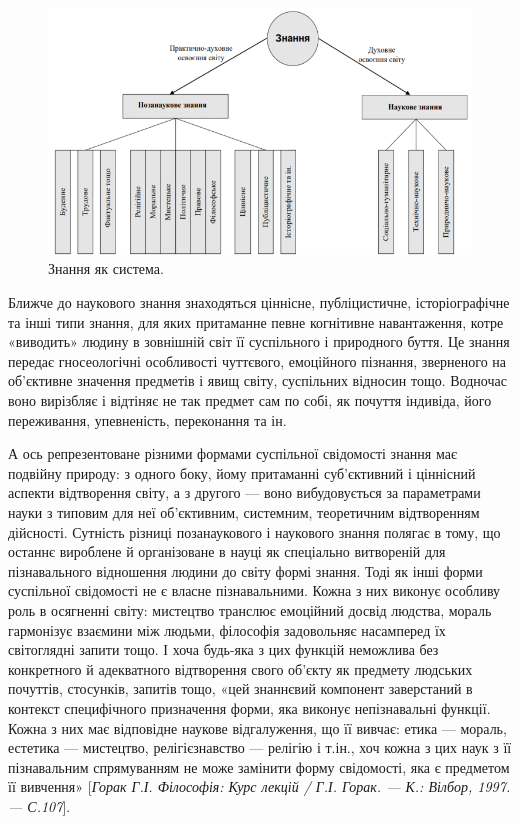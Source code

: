 \begin{figure}[ht]
	\centering
	\includegraphics[scale=.5]{images/filosophy_diagram_1.png}
	\caption{Знання як система.}\label{fig:philosophy:knolage_as_a_system}
\end{figure}

Ближче до наукового знання знаходяться ціннісне, публіцистичне,
історіографічне та інші типи знання, для яких притаманне певне когнітивне
навантаження, котре «виводить» людину в зовнішній світ її суспільного і
природного буття. Це знання передає гносеологічні особливості чуттєвого,
емоційного пізнання, зверненого на об’єктивне значення предметів і явищ
світу, суспільних відносин тощо. Водночас воно вирізбляє і відтіняє не так
предмет сам по собі, як почуття індивіда, його переживання, упевненість,
переконання та ін.

А ось репрезентоване різними формами суспільної свідомості знання має
подвійну природу: з одного боку, йому притаманні суб’єктивний і ціннісний
аспекти відтворення світу, а з другого --- воно вибудовується за параметрами
науки з типовим для неї об’єктивним, системним, теоретичним відтворенням
дійсності. Сутність різниці позанаукового і наукового знання полягає в тому,
що останнє вироблене й організоване в науці як спеціально витвореній для
пізнавального відношення людини до світу формі знання. Тоді як інші форми
суспільної свідомості не є власне пізнавальними. Кожна з них виконує
особливу роль в осягненні світу: мистецтво транслює емоційний досвід
людства, мораль гармонізує взаємини між людьми, філософія задовольняє
насамперед їх світоглядні запити тощо. І хоча будь-яка з цих функцій
неможлива без конкретного й адекватного відтворення свого об’єкту як
предмету людських почуттів, стосунків, запитів тощо, «цей знаннєвий
компонент заверстаний в контекст специфічного призначення форми, яка
виконує непізнавальні функції. Кожна з них має відповідне наукове
відгалуження, що її вивчає: етика --- мораль, естетика --- мистецтво,
релігієзнавство --- релігію і т.ін., хоч кожна з цих наук з її пізнавальним
спрямуванням не може замінити форму свідомості, яка є предметом її
вивчення» [\textit{Горак Г.І. Філософія: Курс лекцій / Г.І. Горак. --- К.: Вілбор, 1997. ---
С.107}].

